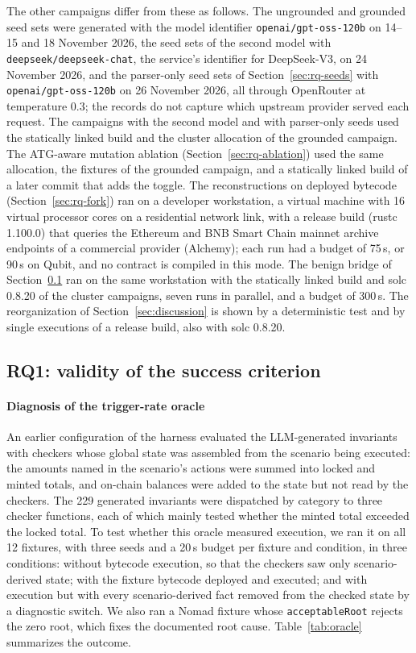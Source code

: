 \documentclass[a4paper]{cas-sc}
\begin{document}
The other campaigns differ from these as follows. The ungrounded and grounded seed sets were generated with the model identifier \texttt{openai/gpt-oss-120b} on 14--15 and 18 November 2026, the seed sets of the second model with \texttt{deepseek/deepseek-chat}, the service's identifier for DeepSeek-V3, on 24 November 2026, and the parser-only seed sets of Section~\ref{sec:rq-seeds} with \texttt{openai/gpt-oss-120b} on 26 November 2026, all through OpenRouter at temperature 0.3; the records do not capture which upstream provider served each request. The campaigns with the second model and with parser-only seeds used the statically linked build and the cluster allocation of the grounded campaign. The ATG-aware mutation ablation (Section~\ref{sec:rq-ablation}) used the same allocation, the fixtures of the grounded campaign, and a statically linked build of a later commit that adds the toggle. The reconstructions on deployed bytecode (Section~\ref{sec:rq-fork}) ran on a developer workstation, a virtual machine with 16 virtual processor cores on a residential network link, with a release build (rustc 1.100.0) that queries the Ethereum and BNB Smart Chain mainnet archive endpoints of a commercial provider (Alchemy); each run had a budget of 75\,s, or 90\,s on Qubit, and no contract is compiled in this mode. The benign bridge of Section~\ref{sec:rq-oracle} ran on the same workstation with the statically linked build and solc 0.8.20 of the cluster campaigns, seven runs in parallel, and a budget of 300\,s. The reorganization of Section~\ref{sec:discussion} is shown by a deterministic test and by single executions of a release build, also with solc 0.8.20.

\subsection{RQ1: validity of the success criterion}\label{sec:rq-oracle}

\paragraph{Diagnosis of the trigger-rate oracle}
An earlier configuration of the harness evaluated the LLM-generated invariants with checkers whose global state was assembled from the scenario being executed: the amounts named in the scenario's actions were summed into locked and minted totals, and on-chain balances were added to the state but not read by the checkers. The 229 generated invariants were dispatched by category to three checker functions, each of which mainly tested whether the minted total exceeded the locked total. To test whether this oracle measured execution, we ran it on all 12 fixtures, with three seeds and a 20\,s budget per fixture and condition, in three conditions: without bytecode execution, so that the checkers saw only scenario-derived state; with the fixture bytecode deployed and executed; and with execution but with every scenario-derived fact removed from the checked state by a diagnostic switch. We also ran a Nomad fixture whose \texttt{acceptableRoot} rejects the zero root, which fixes the documented root cause. Table~\ref{tab:oracle} summarizes the outcome.
\end{document}

